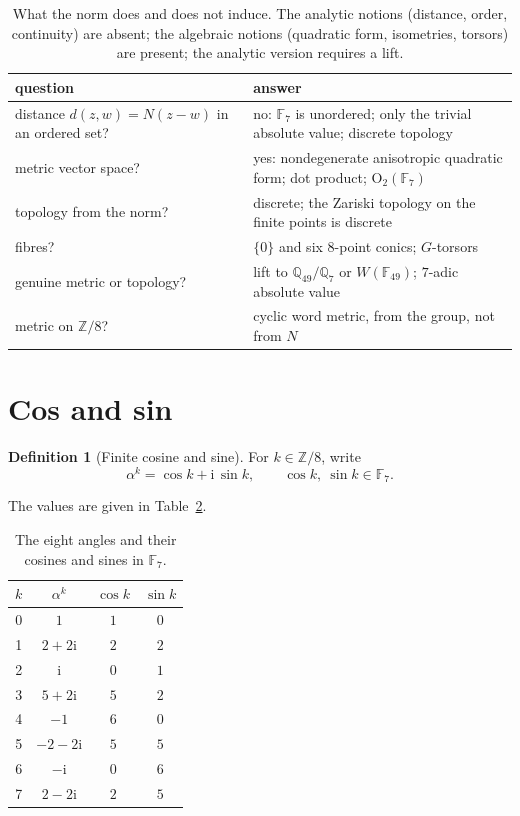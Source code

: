 \documentclass[11pt]{article}
\theoremstyle{definition}
\newtheorem{definition}[theorem]{Definition}
\theoremstyle{remark}
\newcommand{\F}{\mathbb{F}}
\newcommand{\Z}{\mathbb{Z}}
\newcommand{\ii}{\mathrm{i}}
\newcommand{\Norm}{N}
\newcommand{\Q}{\mathbb{Q}}
\begin{document}
\begin{table}[htbp]
\centering
\small
\begin{tabularx}{\textwidth}{@{}>{\raggedright\arraybackslash}p{}X@{}}
\toprule
question & answer\\
\midrule
distance $d(z,w)=\Norm(z-w)$ in an ordered set?
  & no: $\F_7$ is unordered; only the trivial absolute value; discrete topology\\
metric vector space?
  & yes: nondegenerate anisotropic quadratic form; dot product; $\mathrm{O}_2(\F_7)$\\
topology from the norm?
  & discrete; the Zariski topology on the finite points is discrete\\
fibres?
  & $\{0\}$ and six $8$-point conics; $G$-torsors\\
genuine metric or topology?
  & lift to $\Q_{49}/\Q_7$ or $W(\F_{49})$; $7$-adic absolute value\\
metric on $\Z/8$?
  & cyclic word metric, from the group, not from $\Norm$\\
\bottomrule
\end{tabularx}
\caption{What the norm does and does not induce.  The analytic notions
(distance, order, continuity) are absent; the algebraic notions (quadratic
form, isometries, torsors) are present; the analytic version requires a lift.}
\label{tab:norm}
\end{table}

\section{Cos and sin}
\label{sec:cos-sin}

\begin{definition}[Finite cosine and sine]
For $k\in\Z/8$, write
\[
  \alpha^k=\cos k+\ii\,\sin k,\qquad \cos k,\ \sin k\in\F_7 .
\]
\end{definition}

The values are given in Table~\ref{tab:trig}.

\begin{table}[htbp]
\centering
\begin{tabular}{@{}cccc@{}}
\toprule
$k$ & $\alpha^k$ & $\cos k$ & $\sin k$\\
\midrule
0 & $1$       & $1$ & $0$\\
1 & $2+2\ii$  & $2$ & $2$\\
2 & $\ii$     & $0$ & $1$\\
3 & $5+2\ii$  & $5$ & $2$\\
4 & $-1$      & $6$ & $0$\\
5 & $-2-2\ii$ & $5$ & $5$\\
6 & $-\ii$    & $0$ & $6$\\
7 & $2-2\ii$  & $2$ & $5$\\
\bottomrule
\end{tabular}
\caption{The eight angles and their cosines and sines in $\F_7$.}
\label{tab:trig}
\end{table}
\end{document}
